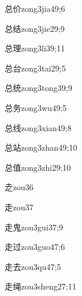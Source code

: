 \begin{verbete}{总价}{zong3jia4}{9;6}
\end{verbete}
\begin{verbete}{总结}{zong3jie2}{9;9}
\end{verbete}
\begin{verbete}{总理}{zong3li3}{9;11}
\end{verbete}
\begin{verbete}{总台}{zong3tai2}{9;5}
\end{verbete}
\begin{verbete}{总统}{zong3tong3}{9;9}
\end{verbete}
\begin{verbete}{总务}{zong3wu4}{9;5}
\end{verbete}
\begin{verbete}{总线}{zong3xian4}{9;8}
\end{verbete}
\begin{verbete}{总站}{zong3zhan4}{9;10}
\end{verbete}
\begin{verbete}{总值}{zong3zhi2}{9;10}
\end{verbete}
\begin{verbete}{赱}{zou3}{6}
\end{verbete}
\begin{verbete}{走}{zou3}{7}
\end{verbete}
\begin{verbete}{走鬼}{zou3gui3}{7;9}
\end{verbete}
\begin{verbete}{走过}{zou3guo4}{7;6}
\end{verbete}
\begin{verbete}{走去}{zou3qu4}{7;5}
\end{verbete}
\begin{verbete}{走绳}{zou3sheng2}{7;11}
\end{verbete}
